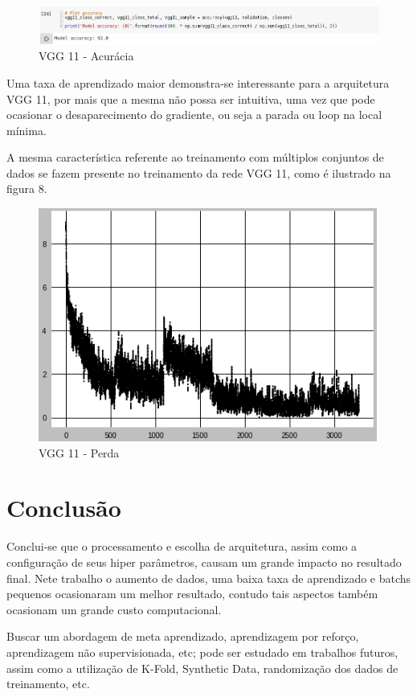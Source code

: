 \documentclass[12pt]{article}
\newcommand\tab[1][1cm]{\hspace*{#1}}
\begin{document}
\begin{figure}[ht]
\centering
\includegraphics[width=.9\textwidth]{vgg11_accuracy.png}
\caption{VGG 11 - Acurácia}
\label{fig:vgg11accuracy}
\end{figure}

\tab\tab[0.5pt] Uma taxa de aprendizado maior demonstra-se interessante para a arquitetura VGG 11, por mais que a mesma não possa ser intuitiva, uma vez que pode ocasionar o desaparecimento do gradiente, ou seja a parada ou loop na local mínima.

\tab\tab[0.5pt] A mesma característica referente ao treinamento com múltiplos conjuntos de dados se fazem presente no treinamento da rede VGG 11, como é ilustrado na figura 8.

\begin{figure}[ht]
\centering
\includegraphics[width=.9\textwidth]{vgg11_loss.png}
\caption{VGG 11 - Perda}
\label{fig:vgg11loss}
\end{figure}

\section{Conclusão}

\tab\tab[0.5pt] Conclui-se que o processamento e escolha de arquitetura, assim como a configuração de seus hiper parâmetros, causam um grande impacto no resultado final. Nete trabalho o aumento de dados, uma baixa taxa de aprendizado e batchs pequenos ocasionaram um melhor resultado, contudo tais aspectos também ocasionam um grande custo computacional.

Buscar um abordagem de meta aprendizado, aprendizagem por reforço, aprendizagem não supervisionada, etc; pode ser estudado em trabalhos futuros, assim como a utilização de K-Fold, Synthetic Data, randomização dos dados de treinamento, etc.




\end{document}
